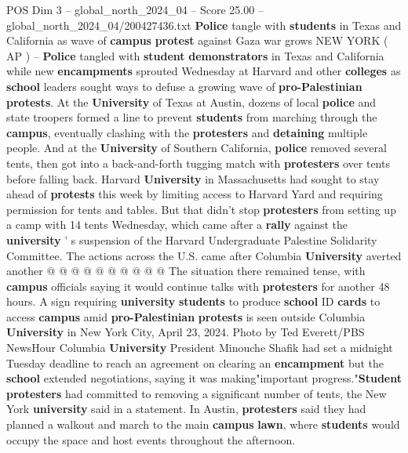 \begin{textsample}{POS Dim 3 – global\_north\_2024\_04 – Score 25.00 – global\_north\_2024\_04/200427436.txt}  \label{ex:f3_pos_078}
\textbf{Police} tangle with \textbf{students} in Texas and California as wave of \textbf{campus} \textbf{protest} against Gaza war grows NEW YORK ( AP ) -- \textbf{Police} tangled with \textbf{student} \textbf{demonstrators} in Texas and California while new \textbf{encampments} sprouted Wednesday at Harvard and other \textbf{colleges} as \textbf{school} leaders sought ways to defuse a growing wave of \textbf{pro-Palestinian} \textbf{protests}.
At the \textbf{University} of Texas at Austin, dozens of local \textbf{police} and state troopers formed a line to prevent \textbf{students} from marching through the \textbf{campus}, eventually clashing with the \textbf{protesters} and \textbf{detaining} multiple people.
And at the \textbf{University} of Southern California, \textbf{police} removed several tents, then got into a back-and-forth tugging match with \textbf{protesters} over tents before falling back.
Harvard \textbf{University} in Massachusetts had sought to stay ahead of \textbf{protests} this week by limiting access to Harvard Yard and requiring permission for tents and tables.
But that didn't stop \textbf{protesters} from setting up a camp with 14 tents Wednesday, which came after a \textbf{rally} against the \textbf{university} ' s suspension of the Harvard Undergraduate Palestine Solidarity Committee.
The actions across the U.S. came after Columbia \textbf{University} averted another @ @ @ @ @ @ @ @ @ @ The situation there remained tense, with \textbf{campus} officials saying it would continue talks with \textbf{protesters} for another 48 hours.
A sign requiring \textbf{university} \textbf{students} to produce \textbf{school} ID \textbf{cards} to access \textbf{campus} amid \textbf{pro-Palestinian} \textbf{protests} is seen outside Columbia \textbf{University} in New York City, April 23, 2024.
Photo by Ted Everett/PBS NewsHour Columbia \textbf{University} President Minouche Shafik had set a midnight Tuesday deadline to reach an agreement on clearing an \textbf{encampment} but the \textbf{school} extended negotiations, saying it was making"important progress."\textbf{Student} \textbf{protesters} had committed to removing a significant number of tents, the New York \textbf{university} said in a statement.
In Austin, \textbf{protesters} said they had planned a walkout and march to the main \textbf{campus} \textbf{lawn}, where \textbf{students} would occupy the space and host events throughout the afternoon.

\end{textsample}
